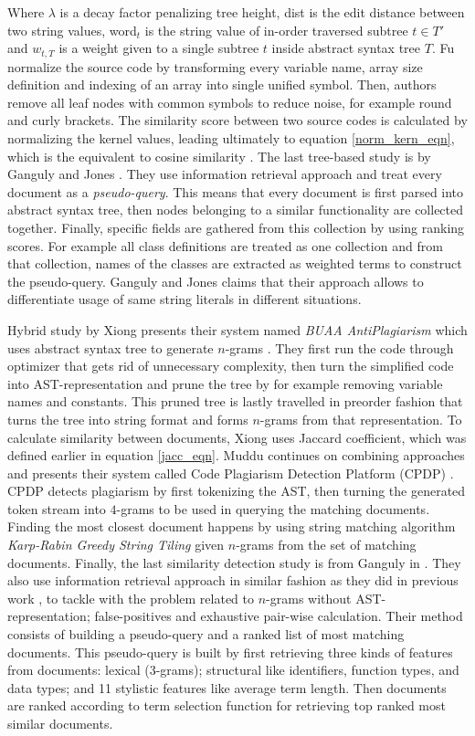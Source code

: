 \noindent
Where $\lambda$ is a decay factor penalizing tree height, dist is the edit distance between two string values, word$_t$ is the string value of in-order traversed subtree $t \in T'$ and $w_{t, T}$ is a weight given to a single subtree $t$ inside abstract syntax tree $T$. Fu \etal normalize the source code by transforming every variable name, array size definition and indexing of an array into single unified symbol. Then, authors remove all leaf nodes with common symbols to reduce noise, for example round and curly brackets. The similarity score between two source codes is calculated by normalizing the kernel values, leading ultimately to equation \ref{norm_kern_eqn}, which is the equivalent to cosine similarity \cite{Fu2017WASTKAW}. The last tree-based study is by Ganguly and Jones \cite{AIR2015}. They use information retrieval approach and treat every document as a \emph{pseudo-query}. This means that every document is first parsed into abstract syntax tree, then nodes belonging to a similar functionality are collected together. Finally, specific fields are gathered from this collection by using ranking scores. For example all class definitions are treated as one collection and from that collection, names of the classes are extracted as weighted terms to construct the pseudo-query. Ganguly and Jones claims that their approach allows to differentiate usage of same string literals in different situations.

Hybrid study by Xiong \etal presents their system named \textit{BUAA AntiPlagiarism} which uses abstract syntax tree to generate $n$-grams \cite{BUAA2009}. They first run the code through optimizer that gets rid of unnecessary complexity, then turn the simplified code into AST-representation and prune the tree by for example removing variable names and constants. This pruned tree is lastly travelled in preorder fashion that turns the tree into string format and forms $n$-grams from that representation. To calculate similarity between documents, Xiong \etal uses Jaccard coefficient, which was defined earlier in equation \ref{jacc_eqn}. Muddu \etal continues on combining approaches and presents their system called Code Plagiarism Detection Platform (CPDP) \cite{CPDPPD2013}. CPDP detects plagiarism by first tokenizing the AST, then turning the generated token stream into $4$-grams to be used in querying the matching documents. Finding the most closest document happens by using string matching algorithm \emph{Karp-Rabin Greedy String Tiling} given $n$-grams from the set of matching documents. Finally, the last similarity detection study is from Ganguly \etal in \cite{RCISCP2017}. They also use information retrieval approach in similar fashion as they did in previous work \cite{AIR2015}, to tackle with the problem related to $n$-grams without AST-representation; false-positives and exhaustive pair-wise calculation. Their method consists of building a pseudo-query and a ranked list of most matching documents. This pseudo-query is built by first retrieving three kinds of features from documents: lexical (3-grams); structural like identifiers, function types, and data types; and 11 stylistic features like average term length. Then documents are ranked according to term selection function for retrieving top ranked most similar documents. 

